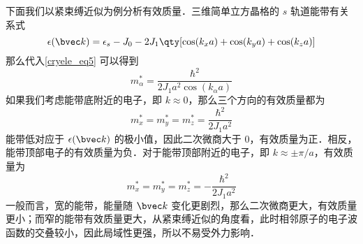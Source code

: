 下面我们以紧束缚近似为例分析有效质量．三维简单立方晶格的 $s$ 轨道能带有关系式
\begin{equation}
\epsilon(\bvec k)=\epsilon_s-J_0-2J_1\qty[\cos(k_xa)+\cos(k_ya)+\cos(k_za)]
\end{equation}
那么代入\autoref{cryele_eq5} 可以得到
\begin{equation}
m_\alpha^*=\frac{\hbar^2}{2 J_1 a^2\cos(k_\alpha a)}
\end{equation}
如果我们考虑能带底附近的电子，即 $k\approx 0$，那么三个方向的有效质量都为
\begin{equation}
m_x^*=m_y^*=m_z^*=\frac{\hbar^2}{2J_1a^2}
\end{equation}
能带低对应于 $\epsilon(\bvec k)$ 的极小值，因此二次微商大于 $0$，有效质量为正．相反，能带顶部电子的有效质量为负．对于能带顶部附近的电子，即 $k\approx \pm \pi/a$，有效质量为
\begin{equation}
m_x^*=m_y^*=m_z^*=-\frac{\hbar^2}{2J_1a^2}
\end{equation}
一般而言，宽的能带，能量随 $\bvec k$ 变化更剧烈，那么二次微商更大，有效质量更小；而窄的能带有效质量更大，从紧束缚近似的角度看，此时相邻原子的电子波函数的交叠较小，因此局域性更强，所以不易受外力影响．

